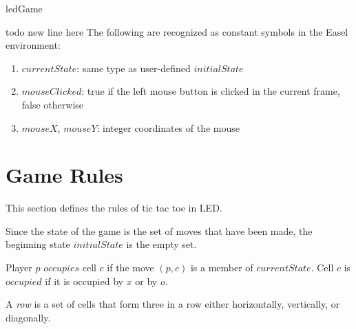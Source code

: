 \documentclass{../lib}
\begin{document}
\begin{ledDef}
ledGame
\end{ledDef}

\begin{ledCmnt}
todo new line here
The following are recognized as constant symbols in the Easel environment:
\begin{enumerate}
\item $currentState$: same type as user-defined $initialState$
\item $mouseClicked$: true if the left mouse button is clicked in the current frame, false otherwise
\item $mouseX$, $mouseY$: integer coordinates of the mouse
\end{enumerate}

\section{Game Rules}

This section defines the rules of tic tac toe in LED.

Since the state of the game is the set of moves that have been made, the beginning state $initialState$ is the empty set.
\end{ledCmnt}

\begin{ledDef}
\end{ledDef}

\begin{ledCmnt}
Player $p$ $occupies$ cell $c$ if the move $(p,c)$ is a member of $currentState$. Cell $c$ is $occupied$ if it is occupied by $x$ or by $o$.
\end{ledCmnt}

\begin{ledDef}
\end{ledDef}

\begin{ledDef}
\end{ledDef}

\begin{ledCmnt}
A {\em row} is a set of cells that form three in a row either horizontally, vertically, or diagonally.
\end{ledCmnt}
\end{document}

